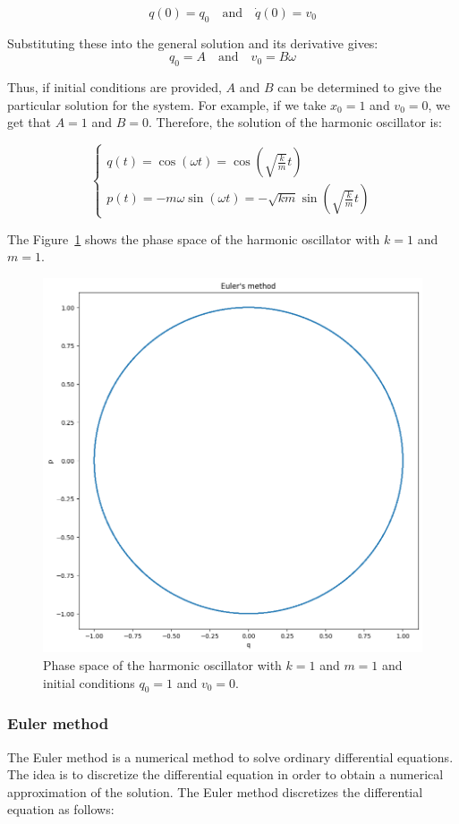 \documentclass{article}
\begin{document}
\[
q(0) = q_0 \quad \text{and} \quad \dot{q}(0) = v_0
\]

Substituting these into the general solution and its derivative gives:
\[
q_0 = A \quad \text{and} \quad v_0 = B \omega
\]

Thus, if initial conditions are provided, \( A \) and \( B \) can be determined to give the particular solution for the system. For example, if we take \(x_0 = 1\) and \(v_0 = 0\), we get that \(A = 1\) and \(B = 0\). Therefore, the solution of the harmonic oscillator is:

\[
	\begin{cases}
		q(t) = \cos(\omega t) = \cos(\sqrt{\frac{k}{m}} t) \\
		p(t) = -m \omega \sin(\omega t) = -\sqrt{km} \sin(\sqrt{\frac{k}{m}} t)
	\end{cases}
\]

The Figure~\ref{fig:harmonicoscillator} shows the phase space of the harmonic oscillator with \(k = 1\) and \(m = 1\).

\begin{figure}[H]
	\centering
	\includegraphics[width=0.5\linewidth]{./Figures/Sympletic/phaseanalytics.png}
	\caption{Phase space of the harmonic oscillator with \(k = 1\) and \(m = 1\) and initial conditions \(q_0 = 1\) and \(v_0 = 0\).}
	\label{fig:harmonicoscillator}
\end{figure}


\subsubsection{Euler method}
\label{sec:euler_method}

The Euler method is a numerical method to solve ordinary differential equations. The idea is to discretize the differential equation in order to obtain a numerical approximation of the solution. The Euler method discretizes the differential equation as follows:
\end{document}
